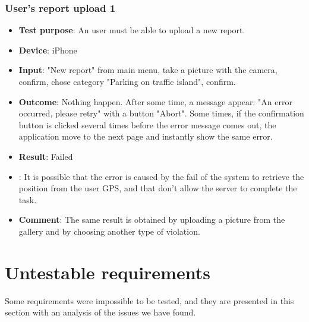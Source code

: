 \documentclass[../ATD.tex]{subfiles}
\begin{document}
    \subsubsection{User's report upload 1}\label{subsubsec:user-report-upload-1}
    \begin{itemize}
        \item \textbf{Test purpose}: An user must be able to upload a new report.
        \item \textbf{Device}: iPhone
        \item \textbf{Input}: "New report" from main menu, take a picture with the camera, confirm, chose category "Parking on traffic island", confirm.
        \item \textbf{Outcome}: Nothing happen.
        After some time, a message appear: "An error occurred, please retry" with a button "Abort".
        Some times, if the confirmation button is clicked several times before the error message comes out, the application move to the next page and instantly show the same error.
        \item \textbf{Result}: Failed
        \item {}: It is possible that the error is caused by the fail of the system to retrieve the position from the user GPS, and that don't allow the server to complete the task.
        \item \textbf{Comment}: The same result is obtained by uploading a picture from the gallery and by choosing another type of violation.
    \end{itemize}

    \section{Untestable requirements}\label{sec:untestable-requirements}
    Some requirements were impossible to be tested, and they are presented in this section with an analysis of the issues we have found.
\end{document}
